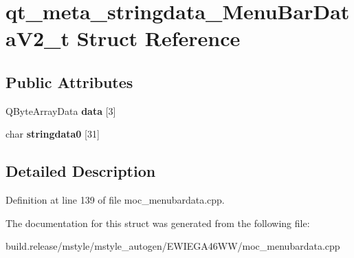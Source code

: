 \hypertarget{structqt__meta__stringdata___menu_bar_data_v2__t}{}\section{qt\+\_\+meta\+\_\+stringdata\+\_\+\+Menu\+Bar\+Data\+V2\+\_\+t Struct Reference}
\label{structqt__meta__stringdata___menu_bar_data_v2__t}
\subsection*{Public Attributes}
\begin{DoxyCompactItemize}
\item 
\mbox{\label{structqt__meta__stringdata___menu_bar_data_v2__t_a68c314c945f3ab578a018d6ec6d8630a}} 
Q\+Byte\+Array\+Data {\bfseries data} \mbox{[}3\mbox{]}
\item 
\mbox{\label{structqt__meta__stringdata___menu_bar_data_v2__t_abb881ce605e5557237b094e10dff2a66}} 
char {\bfseries stringdata0} \mbox{[}31\mbox{]}
\end{DoxyCompactItemize}


\subsection{Detailed Description}


Definition at line 139 of file moc\+\_\+menubardata.\+cpp.



The documentation for this struct was generated from the following file\+:\begin{DoxyCompactItemize}
\item 
build.\+release/mstyle/mstyle\+\_\+autogen/\+E\+W\+I\+E\+G\+A46\+W\+W/moc\+\_\+menubardata.\+cpp\end{DoxyCompactItemize}
